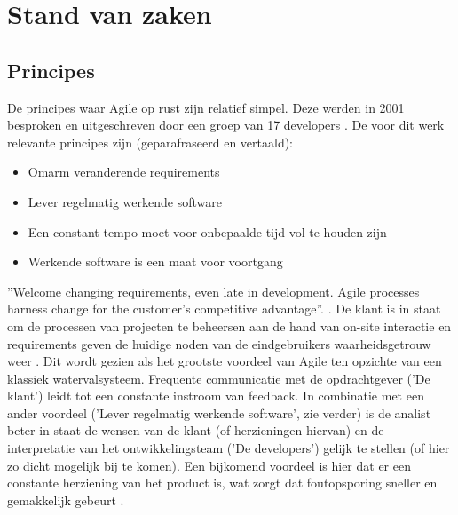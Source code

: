 
\section{Stand van zaken}
\label{sec:state-of-the-art}

%
%
%

\subsection{Principes}
De principes waar Agile op rust zijn relatief simpel. Deze werden in 2001 besproken en uitgeschreven door een groep van 17 developers \autocite{Beck2001}. De voor dit werk relevante principes zijn (geparafraseerd en vertaald):
\begin{itemize}
  \item Omarm veranderende requirements
  \item Lever regelmatig werkende software
  \item Een constant tempo moet voor onbepaalde tijd vol te houden zijn
  \item Werkende software is een maat voor voortgang
\end{itemize}

''Welcome changing requirements, even late in
development. Agile processes harness change for
the customer's competitive advantage''. \autocite{Beck2001}. De klant is in staat om de processen van projecten te beheersen  aan de hand van on-site interactie en requirements geven de huidige noden van de eindgebruikers waarheidsgetrouw weer \autocite{Kumar2012}. Dit wordt gezien als het grootste voordeel van Agile ten opzichte van een klassiek watervalsysteem. Frequente communicatie met de opdrachtgever ('De klant') leidt tot een constante instroom van feedback. In combinatie met een ander voordeel ('Lever regelmatig werkende software', zie verder) is de analist beter in staat de wensen van de klant (of herzieningen hiervan) en de interpretatie van het ontwikkelingsteam ('De developers') gelijk te stellen (of hier zo dicht mogelijk bij te komen). Een bijkomend voordeel is hier dat er een constante herziening van het product is, wat zorgt dat foutopsporing sneller en gemakkelijk gebeurt \autocite{Imreh2011}.

